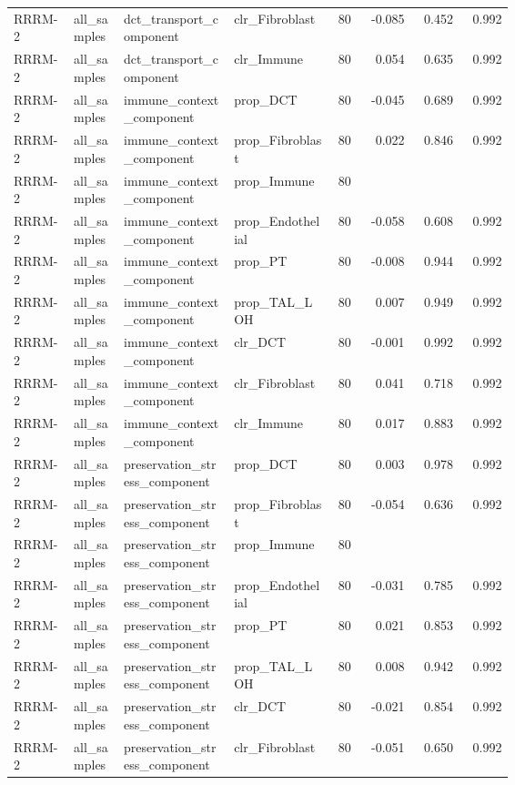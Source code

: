 \documentclass[11pt]{article}
\begin{document}
\begin{landscape}
\begin{longtable}{p{0.12\linewidth}p{0.10\linewidth}p{0.22\linewidth}p{0.20\linewidth}rrrr}
RRRM-2 & all\_samples & dct\_transport\_component & clr\_Fibroblast & 80 & -0.085 & 0.452 & 0.992 \\
RRRM-2 & all\_samples & dct\_transport\_component & clr\_Immune & 80 & 0.054 & 0.635 & 0.992 \\
RRRM-2 & all\_samples & immune\_context\_component & prop\_DCT & 80 & -0.045 & 0.689 & 0.992 \\
RRRM-2 & all\_samples & immune\_context\_component & prop\_Fibroblast & 80 & 0.022 & 0.846 & 0.992 \\
RRRM-2 & all\_samples & immune\_context\_component & prop\_Immune & 80 &  &  &  \\
RRRM-2 & all\_samples & immune\_context\_component & prop\_Endothelial & 80 & -0.058 & 0.608 & 0.992 \\
RRRM-2 & all\_samples & immune\_context\_component & prop\_PT & 80 & -0.008 & 0.944 & 0.992 \\
RRRM-2 & all\_samples & immune\_context\_component & prop\_TAL\_LOH & 80 & 0.007 & 0.949 & 0.992 \\
RRRM-2 & all\_samples & immune\_context\_component & clr\_DCT & 80 & -0.001 & 0.992 & 0.992 \\
RRRM-2 & all\_samples & immune\_context\_component & clr\_Fibroblast & 80 & 0.041 & 0.718 & 0.992 \\
RRRM-2 & all\_samples & immune\_context\_component & clr\_Immune & 80 & 0.017 & 0.883 & 0.992 \\
RRRM-2 & all\_samples & preservation\_stress\_component & prop\_DCT & 80 & 0.003 & 0.978 & 0.992 \\
RRRM-2 & all\_samples & preservation\_stress\_component & prop\_Fibroblast & 80 & -0.054 & 0.636 & 0.992 \\
RRRM-2 & all\_samples & preservation\_stress\_component & prop\_Immune & 80 &  &  &  \\
RRRM-2 & all\_samples & preservation\_stress\_component & prop\_Endothelial & 80 & -0.031 & 0.785 & 0.992 \\
RRRM-2 & all\_samples & preservation\_stress\_component & prop\_PT & 80 & 0.021 & 0.853 & 0.992 \\
RRRM-2 & all\_samples & preservation\_stress\_component & prop\_TAL\_LOH & 80 & 0.008 & 0.942 & 0.992 \\
RRRM-2 & all\_samples & preservation\_stress\_component & clr\_DCT & 80 & -0.021 & 0.854 & 0.992 \\
RRRM-2 & all\_samples & preservation\_stress\_component & clr\_Fibroblast & 80 & -0.051 & 0.650 & 0.992 \\

\end{longtable}
\end{landscape}
\end{document}
